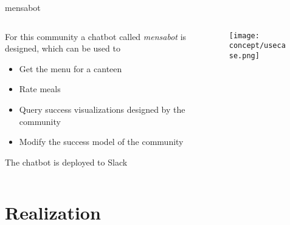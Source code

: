 \begin{frame}{mensabot}
  \begin{columns}
    \begin{column}[]{0.3\textwidth}
      For this community a chatbot called \emph{mensabot} is designed, which can be used to
  \begin{itemize}
    \item Get the menu for a canteen
    \item Rate meals
    \item Query success visualizations designed by the community
    \item Modify the success model of the community
  \end{itemize}
  The chatbot is deployed to Slack
    \end{column}
    \begin{column}[]{0.7\textwidth}
      \begin{figure}
          \centering
          \texttt{[image: concept/usecase.png]}
      \end{figure}
    \end{column}     
  \end{columns}
\end{frame}





\section{Realization}

